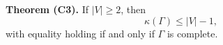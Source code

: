 \textbf{Theorem (C3).} If $|V| \geq 2$, then
$$\kappa(\Gamma) \leq |V| - 1,$$
with equality holding if and only if $\Gamma$ is complete.
